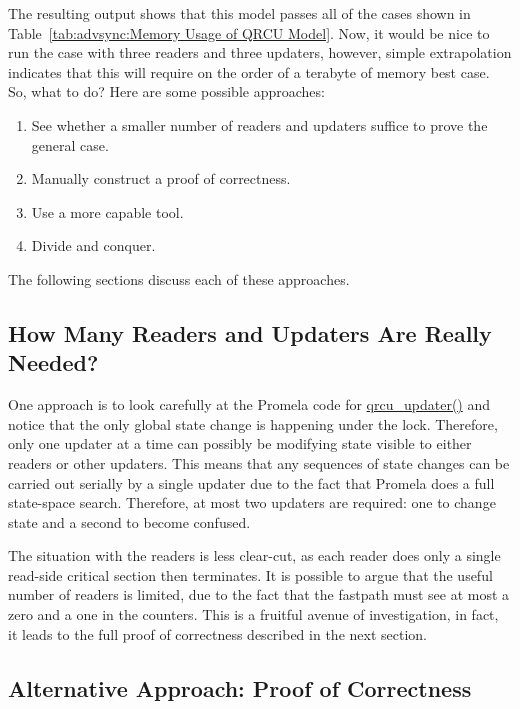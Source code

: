 The resulting output shows that this model passes all of the cases
shown in
Table~\ref{tab:advsync:Memory Usage of QRCU Model}.
Now, it would be nice to run the case with three readers and three
updaters, however, simple extrapolation indicates that this will
require on the order of a terabyte of memory best case.
So, what to do?
Here are some possible approaches:

\begin{enumerate}
\item	See whether a smaller number of readers and updaters suffice
	to prove the general case.
\item	Manually construct a proof of correctness.
\item	Use a more capable tool.
\item	Divide and conquer.
\end{enumerate}

The following sections discuss each of these approaches.

\subsection{How Many Readers and Updaters Are Really Needed?}
\label{app:formal:How Many Readers and Updaters Are Really Needed?}

One approach is to look carefully at the Promela code for
\url{qrcu_updater()} and notice that the only global state
change is happening under the lock.
Therefore, only one updater at a time can possibly be modifying
state visible to either readers or other updaters.
This means that any sequences of state changes can be carried
out serially by a single updater due to the fact that Promela does a full
state-space search.
Therefore, at most two updaters are required: one to change state
and a second to become confused.

The situation with the readers is less clear-cut, as each reader
does only a single read-side critical section then terminates.
It is possible to argue that the useful number of readers is limited,
due to the fact that the fastpath must see at most a zero and a one
in the counters.
This is a fruitful avenue of investigation, in fact, it leads to
the full proof of correctness described in the next section.

\subsection{Alternative Approach: Proof of Correctness}
\label{app:formal:Alternative Approach: Proof of Correctness}

